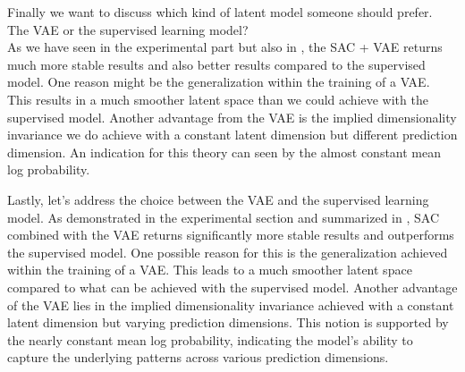 

Finally we want to discuss which kind of latent model someone should prefer. The VAE or the supervised learning model? \\
As we have seen in the experimental part but also in , the SAC + VAE returns much more stable results and also better results compared to the supervised model. One reason might be the generalization within the training of a VAE. This results in a much smoother latent space than we could achieve with the supervised model. Another advantage from the VAE is the implied dimensionality invariance we do achieve with a constant latent dimension but different prediction dimension. An indication for this theory can seen by the almost constant mean log probability. 


Lastly, let's address the choice between the VAE and the supervised learning model. As demonstrated in the experimental section and summarized in , SAC combined with the VAE returns significantly more stable results and outperforms the supervised model. One possible reason for this is the generalization achieved within the training of a VAE. This leads to a much smoother latent space compared to what can be achieved with the supervised model. Another advantage of the VAE lies in the implied dimensionality invariance achieved with a constant latent dimension but varying prediction dimensions. This notion is supported by the nearly constant mean log probability, indicating the model's ability to capture the underlying patterns across various prediction dimensions.


